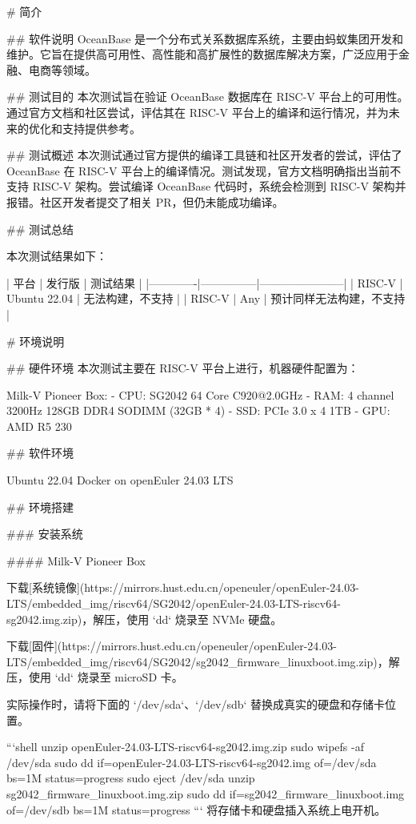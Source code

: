 \documentclass{article}
\begin{document}
\begin{markdown}

# 简介

## 软件说明
OceanBase 是一个分布式关系数据库系统，主要由蚂蚁集团开发和维护。它旨在提供高可用性、高性能和高扩展性的数据库解决方案，广泛应用于金融、电商等领域。

## 测试目的
本次测试旨在验证 OceanBase 数据库在 RISC-V 平台上的可用性。通过官方文档和社区尝试，评估其在 RISC-V 平台上的编译和运行情况，并为未来的优化和支持提供参考。

## 测试概述
本次测试通过官方提供的编译工具链和社区开发者的尝试，评估了 OceanBase 在 RISC-V 平台上的编译情况。测试发现，官方文档明确指出当前不支持 RISC-V 架构。尝试编译 OceanBase 代码时，系统会检测到 RISC-V 架构并报错。社区开发者提交了相关 PR，但仍未能成功编译。

## 测试总结

本次测试结果如下：

| 平台        | 发行版        | 测试结果              |
|-------------|---------------|-----------------------|
| RISC-V      |  Ubuntu 22.04      | 无法构建，不支持        |
| RISC-V      |  Any         | 预计同样无法构建，不支持 |

# 环境说明

## 硬件环境
本次测试主要在 RISC-V 平台上进行，机器硬件配置为：

Milk-V Pioneer Box:
- CPU: SG2042 64 Core C920@2.0GHz
- RAM: 4 channel 3200Hz 128GB DDR4 SODIMM (32GB * 4)
- SSD: PCIe 3.0 x 4 1TB
- GPU: AMD R5 230

## 软件环境

Ubuntu 22.04 Docker on openEuler 24.03 LTS

## 环境搭建

### 安装系统

#### Milk-V Pioneer Box

下载[系统镜像](https://mirrors.hust.edu.cn/openeuler/openEuler-24.03-LTS/embedded_img/riscv64/SG2042/openEuler-24.03-LTS-riscv64-sg2042.img.zip)，解压，使用 `dd` 烧录至 NVMe 硬盘。

下载[固件](https://mirrors.hust.edu.cn/openeuler/openEuler-24.03-LTS/embedded_img/riscv64/SG2042/sg2042_firmware_linuxboot.img.zip)，解压，使用 `dd` 烧录至 microSD 卡。

实际操作时，请将下面的 `/dev/sda`、`/dev/sdb` 替换成真实的硬盘和存储卡位置。

```shell
unzip openEuler-24.03-LTS-riscv64-sg2042.img.zip
sudo wipefs -af /dev/sda
sudo dd if=openEuler-24.03-LTS-riscv64-sg2042.img of=/dev/sda bs=1M status=progress
sudo eject /dev/sda
unzip sg2042_firmware_linuxboot.img.zip
sudo dd if=sg2042_firmware_linuxboot.img of=/dev/sdb bs=1M status=progress
```
将存储卡和硬盘插入系统上电开机。


\end{markdown}
\end{document}
